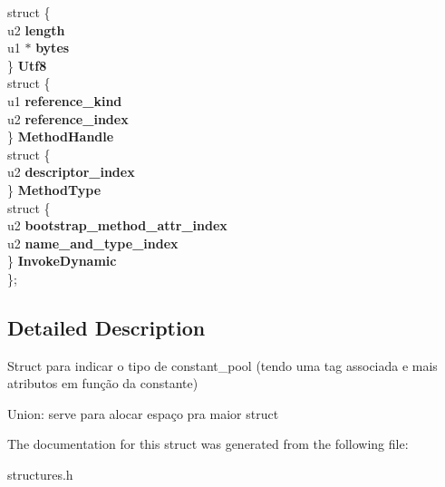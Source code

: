 \begin{DoxyCompactItemize}
\begin{tabbing}
\>struct \{\\
\>\>u2 {\bfseries length}\\
\>\>u1 $\ast$ {\bfseries bytes}\\
\>\} {\bfseries Utf8}\\
\>struct \{\\
\>\>u1 {\bfseries reference\_kind}\\
\>\>u2 {\bfseries reference\_index}\\
\>\} {\bfseries MethodHandle}\\
\>struct \{\\
\>\>u2 {\bfseries descriptor\_index}\\
\>\} {\bfseries MethodType}\\
\>struct \{\\
\>\>u2 {\bfseries bootstrap\_method\_attr\_index}\\
\>\>u2 {\bfseries name\_and\_type\_index}\\
\>\} {\bfseries InvokeDynamic}\\
\}; \hypertarget{structcp__info_a0469358e891d5c89038d59f1807d00b2}{}\label{structcp__info_a0469358e891d5c89038d59f1807d00b2}
\\

\end{tabbing}\end{DoxyCompactItemize}


\subsection{Detailed Description}
Struct para indicar o tipo de constant\+\_\+pool (tendo uma tag associada e mais atributos em função da constante)

Union\+: serve para alocar espaço pra maior struct 

The documentation for this struct was generated from the following file\+:\begin{DoxyCompactItemize}
\item 
structures.\+h\end{DoxyCompactItemize}
